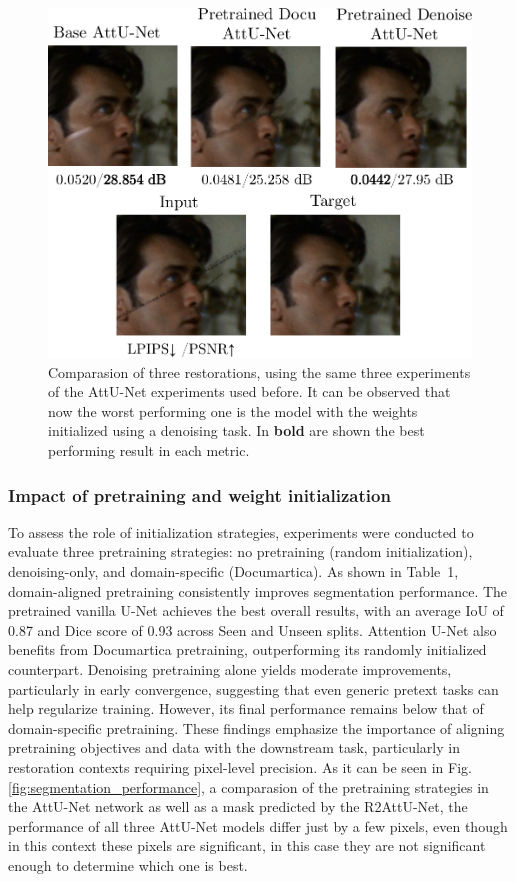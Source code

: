 \documentclass[10pt,a4paper,twocolumn,twoside]{article}
\begin{document}
\begin{figure}[htbp]
    \centering
    \includegraphics[width=0.8\linewidth]{img/repaint.pdf}
    \caption{\small Comparasion of three restorations, using the same three experiments of the AttU-Net experiments used before. It can be observed that now the worst performing one is the model with the weights initialized using a denoising task. In \textbf{bold} are shown the best performing result in each metric. }
    \label{fig:repaint_comparison}
\end{figure}


\subsubsection{Impact of pretraining and weight initialization}
To assess the role of initialization strategies, experiments were conducted to evaluate three pretraining strategies: no pretraining (random initialization), denoising-only, and domain-specific (Documartica). As shown in Table~1, domain-aligned pretraining consistently improves segmentation performance. The pretrained vanilla U-Net achieves the best overall results, with an average IoU of 0.87 and Dice score of 0.93 across Seen and Unseen splits. Attention U-Net also benefits from Documartica pretraining, outperforming its randomly initialized counterpart.
Denoising pretraining alone yields moderate improvements, particularly in early convergence, suggesting that even generic pretext tasks can help regularize training. However, its final performance remains below that of domain-specific pretraining. These findings emphasize the importance of aligning pretraining objectives and data with the downstream task, particularly in restoration contexts requiring pixel-level precision. As it can be seen in Fig. \ref{fig:segmentation_performance}, a comparasion of the pretraining strategies in the AttU-Net network as well as a mask predicted by the R2AttU-Net, the performance of all three AttU-Net models differ just by a few pixels, even though in this context these pixels are significant, in this case they are not significant enough to determine which one is best. 
\end{document}
